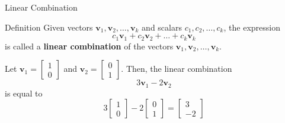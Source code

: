 \documentclass{beamer}
\newcommand{\vv}{\mathbf{v}}
\begin{document}
\begin{frame}{Linear Combination}

  \begin{block}{Definition}
    Given vectors \(\mathbf{v}_1, \mathbf{v}_2, \ldots, \mathbf{v}_k\) and scalars \(c_1, c_2, \ldots, c_k\), the expression
    \[ c_1\mathbf{v}_1 + c_2\mathbf{v}_2 + \ldots + c_k\mathbf{v}_k \]
    is called a \textbf{linear combination} of the vectors \(\mathbf{v}_1, \mathbf{v}_2, \ldots, \mathbf{v}_k\).
  \end{block}

  \pause

  \begin{example}
    Let \(\mathbf{v}_1 = \begin{bmatrix} 1 \\ 0 \end{bmatrix}\) and \(\mathbf{v}_2 = \begin{bmatrix} 0 \\ 1 \end{bmatrix}\). Then, the linear combination
    \[ 3\mathbf{v}_1 - 2\mathbf{v}_2 \]
    is equal to
    \[ 3\begin{bmatrix} 1 \\ 0 \end{bmatrix} - 2\begin{bmatrix} 0 \\ 1 \end{bmatrix} = \begin{bmatrix} 3 \\ -2 \end{bmatrix} \]
  \end{example}
\end{frame}

  
 
\end{document}

